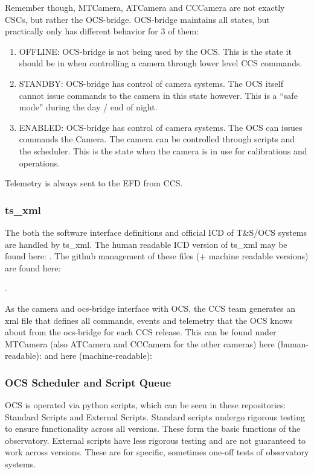 Remember though, MTCamera, ATCamera and CCCamera are not exactly CSCs, but rather the OCS-bridge. OCS-bridge maintains all states, but practically only has different behavior for 3 of them: 
\begin{enumerate}
    \item OFFLINE: OCS-bridge is not being used by the OCS. This is the state it should be in when controlling a camera through lower level CCS commands.
    \item STANDBY: OCS-bridge has control of camera systems. The OCS itself cannot issue commands to the camera in this state however. This is a “safe mode” during the day / end of night.
    \item ENABLED: OCS-bridge has control of camera systems. The OCS can issues commands the Camera. The camera can be controlled through scripts and the scheduler. This is the state when the camera is in use for calibrations and operations.
\end{enumerate}
Telemetry is always sent to the EFD from CCS.

\subsubsection{ts\_xml}
The both the software interface definitions and official ICD of T\&S/OCS systems are handled by ts\_xml. The human readable ICD version of ts\_xml may be found here: . The github management of these files (+ machine readable versions) are found here: 

 . 

As the camera and ocs-bridge interface with OCS, the CCS team generates an xml file that defines all commands, events and telemetry that the OCS knows about from the ocs-bridge for each CCS release. This can be found under MTCamera (also ATCamera and CCCamera for the other cameras) here (human-readable): 
  and here (machine-readable):  

\subsubsection{OCS Scheduler and Script Queue}
OCS is operated via python scripts, which can be seen in these repositories: Standard Scripts and External Scripts. Standard scripts undergo rigorous testing to ensure functionality across all versions. These form the basic functions of the observatory. External scripts have less rigorous testing and are not guaranteed to work across versions. These are for specific, sometimes one-off tests of observatory systems.

